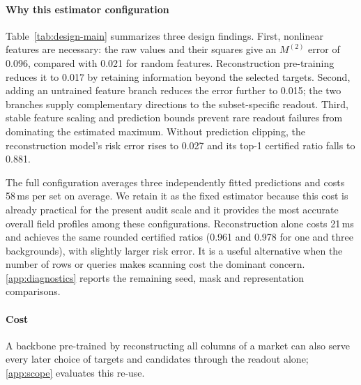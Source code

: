\paragraph{Why this estimator configuration}
Table~\ref{tab:design-main} summarizes three design findings. First, nonlinear features are necessary: the raw values and their squares give an $M^{(2)}$ error of 0.096, compared with 0.021 for random features. Reconstruction pre-training reduces it to 0.017 by retaining information beyond the selected targets. Second, adding an untrained feature branch reduces the error further to 0.015; the two branches supply complementary directions to the subset-specific readout. Third, stable feature scaling and prediction bounds prevent rare readout failures from dominating the estimated maximum. Without prediction clipping, the reconstruction model's risk error rises to 0.027 and its top-1 certified ratio falls to 0.881.

The full configuration averages three independently fitted predictions and costs 58\,ms per set on average. We retain it as the fixed estimator because this cost is already practical for the present audit scale and it provides the most accurate overall field profiles among these configurations. Reconstruction alone costs 21\,ms and achieves the same rounded certified ratios (0.961 and 0.978 for one and three backgrounds), with slightly larger risk error. It is a useful alternative when the number of rows or queries makes scanning cost the dominant concern. \ref{app:diagnostics} reports the remaining seed, mask and representation comparisons.



\paragraph{Cost}
 A backbone pre-trained by reconstructing all columns of a market can also serve every later choice of
targets and candidates through the readout alone; \ref{app:scope} evaluates this re-use.
